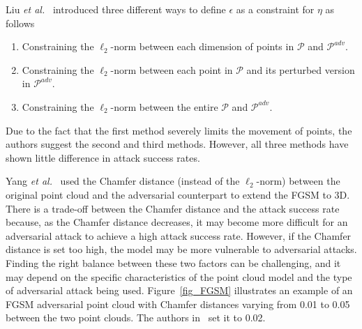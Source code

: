 \documentclass{ieeeaccess}
\def\etal{\textit{et al.}}
\begin{document}
Liu \etal~\cite{liu2019extending} introduced three different ways  to define $\epsilon$ as a constraint for $\eta$ as follows


\begin{enumerate}
    \item Constraining the $\ell_2$-norm between each dimension of points in $\mathcal{P}$ and $\mathcal{P}^{adv}$.
    \item Constraining the $\ell_2$-norm between each point in $\mathcal{P}$ and its perturbed version in $\mathcal{P}^{adv}$.
    \item Constraining the $\ell_2$-norm between %
    the entire $\mathcal{P}$ and $\mathcal{P}^{adv}$.
\end{enumerate}
Due to the fact that the first method severely limits the movement of points, the authors suggest the second and third methods. However, all three methods have shown little difference in attack success rates.

Yang \etal~\cite{yang2019adversarial}  used the Chamfer distance (instead of the $\ell_2$-norm) between the original point cloud and the adversarial counterpart to extend the FGSM to 3D. There is a trade-off between the Chamfer distance and the attack success rate because, as the Chamfer distance decreases, it may become more difficult for an adversarial attack to achieve a high attack success rate. However, if the Chamfer distance is set too high, the model may be more vulnerable to adversarial attacks. Finding the right balance between these two factors can be challenging, and it may depend on the specific characteristics of the point cloud model and the type of adversarial attack being used. Figure~\ref{fig_FGSM} illustrates an example of an FGSM adversarial point cloud with Chamfer distances varying from 0.01 to 0.05 between the two point clouds. The authors in~\cite{yang2019adversarial} set it to 0.02. %
\end{document}
